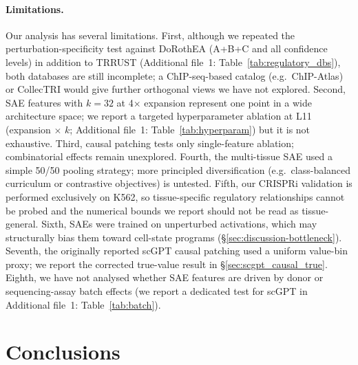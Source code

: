 \documentclass[onecolumn]{article}
\begin{document}
\paragraph{Limitations.}
Our analysis has several limitations. First, although we repeated the perturbation-specificity test against DoRothEA (A+B+C and all confidence levels) in addition to TRRUST (Additional file~1: Table~\ref{tab:regulatory_dbs}), both databases are still incomplete; a ChIP-seq-based catalog (e.g.\ ChIP-Atlas) or CollecTRI would give further orthogonal views we have not explored. Second, SAE features with $k{=}32$ at 4$\times$ expansion represent one point in a wide architecture space; we report a targeted hyperparameter ablation at L11 (expansion $\times$ $k$; Additional file~1: Table~\ref{tab:hyperparam}) but it is not exhaustive. Third, causal patching tests only single-feature ablation; combinatorial effects remain unexplored. Fourth, the multi-tissue SAE used a simple 50/50 pooling strategy; more principled diversification (e.g.\ class-balanced curriculum or contrastive objectives) is untested. Fifth, our CRISPRi validation is performed exclusively on K562, so tissue-specific regulatory relationships cannot be probed and the numerical bounds we report should not be read as tissue-general. Sixth, SAEs were trained on unperturbed activations, which may structurally bias them toward cell-state programs (\S\ref{sec:discussion-bottleneck}). Seventh, the originally reported scGPT causal patching used a uniform value-bin proxy; we report the corrected true-value result in \S\ref{sec:scgpt_causal_true}. Eighth, we have not analysed whether SAE features are driven by donor or sequencing-assay batch effects (we report a dedicated test for scGPT in Additional file~1: Table~\ref{tab:batch}).


\section{Conclusions}
\end{document}
